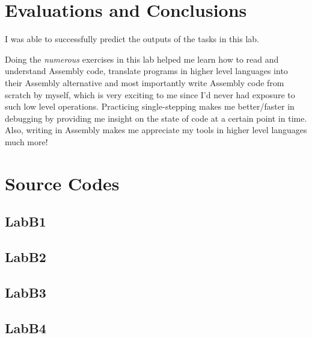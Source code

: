 \documentclass{article}
\begin{document}

\section{Evaluations and Conclusions}
I was able to successfully predict the outputs of the tasks in this lab.\newline

Doing the \textit{numerous} exercises in this lab helped me learn how to read and understand Assembly code, translate programs in higher level languages into their Assembly alternative and most importantly write Assembly code from scratch by myself, which is very exciting to me since I'd never had exposure to such low level operations. Practicing single-stepping makes me better/faster in debugging by providing me insight on the state of code at a certain point in time. Also, writing in Assembly makes me appreciate my tools in higher level languages much more!



\section{Source Codes}


\subsection{LabB1}


\pagebreak

\subsection{LabB2}


\subsection{LabB3}



\subsection{LabB4}

\end{document}
